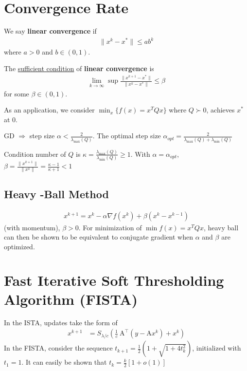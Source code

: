 \documentclass[11pt]{elegantbook}
\begin{document}
\section{Convergence Rate}
We say \textbf{linear convergence} if
\begin{equation}
    \begin{aligned}
        \|x^k-x^*\|\leq ab^k
    \end{aligned}
    \nonumber
\end{equation}
where $a>0$ and $b\in (0,1)$.

The \underline{sufficient condition} of \textbf{linear convergence} is
\begin{equation}
    \begin{aligned}
        \lim_{k \rightarrow \infty}\sup\frac{\|x^{k+1}-x^*\|}{\|x^k-x^*\|}\leq \beta
    \end{aligned}
    \nonumber
\end{equation}
for some $\beta\in (0,1)$.

As an application, we consider $\min_x\{f(x)=x^TQx\}$ where $Q\succ 0$, achieves $x^*$ at $0$.

GD $\Rightarrow $ step size $\alpha<\frac{2}{\lambda_{\max}(Q)}$. The optimal step size $\alpha_{opt}=\frac{2}{\lambda_{\max}(Q)+\lambda_{\min}(Q)}$

Condition number of $Q$ is $\kappa=\frac{\lambda_{\max}(Q)}{\lambda_{\min}(Q)}\geq 1$. With $\alpha=\alpha_{opt}$, $\beta=\frac{\|x^{k+1}\|}{\|x^k\|}=\frac{\kappa-1}{\kappa+1}<1$

\subsection*{Heavy -Ball Method}
\begin{equation}
    \begin{aligned}
        x^{k+1}=x^k-\alpha \nabla f(x^k)+\beta (x^k-x^{k-1})
    \end{aligned}
    \nonumber
\end{equation}
(with momentum), $\beta>0$.
For minimization of $\min f(x)=x^TQx$, heavy ball can then be shown to be equivalent to conjugate gradient when $\alpha$ and $\beta$ are optimized.

\section{Fast Iterative Soft Thresholding Algorithm (FISTA)}
In the ISTA, updates take the form of
\begin{equation}
    \begin{aligned}
        x^{k+1} &=S_{\lambda / c}\left(\frac{1}{c} \mathrm{~A}^{\top}\left(y-\mathrm{A} {x}^k\right)+{x}^k\right)
    \end{aligned}
    \nonumber
\end{equation}
In the FISTA, consider the sequence $t_{k+1}=\frac{1}{2}\left(1+\sqrt{1+4t_k^2}\right)$, initialized with $t_1=1$. It can easily be shown that $t_k=\frac{k}{2}[1+o(1)]$
\end{document}
